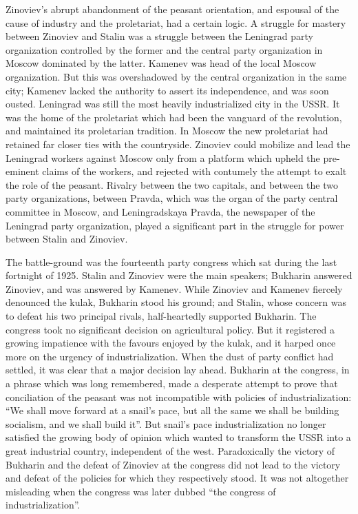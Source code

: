 Zinoviev's abrupt abandonment of the peasant orientation, and espousal of the cause of industry and the proletariat, had a certain logic. A struggle for mastery between Zinoviev and Stalin was a struggle between the Leningrad party organization controlled by the former and the central party organization in Moscow dominated by the latter. Kamenev was head of the local Moscow organization. But this was overshadowed by the central organization in the same city; Kamenev lacked the authority to assert its independence, and was soon ousted. Leningrad was still the most heavily industrialized city in the USSR. It was the home of the proletariat which had been the vanguard of the revolution, and maintained its proletarian tradition. In Moscow the new proletariat had retained far closer ties with the countryside. Zinoviev could mobilize and lead the Leningrad workers against Moscow only from a platform which upheld the pre-eminent claims of the workers, and rejected with contumely the attempt to exalt the role of the peasant. Rivalry between the two capitals, and between the two party organizations, between Pravda, which was the organ of the party central committee in Moscow, and Leningradskaya Pravda, the newspaper of the Leningrad party organization, played a significant part in the struggle for power between Stalin and Zinoviev. 

The battle-ground was the fourteenth party congress which sat during the last fortnight of 1925. Stalin and Zinoviev were the main speakers; Bukharin answered Zinoviev, and was answered by Kamenev. While Zinoviev and Kamenev fiercely denounced the kulak, Bukharin stood his ground; and Stalin, whose concern was to defeat his two principal rivals, half-heartedly supported Bukharin. The congress took no significant decision on agricultural policy. But it registered a growing impatience with the favours enjoyed by the kulak, and it harped once more on the urgency of industrialization. When the dust of party conflict had settled, it was clear that a major decision lay ahead. Bukharin at the congress, in a phrase which was long remembered, made a desperate attempt to prove that conciliation of the peasant was not incompatible with policies of industrialization: ``We shall move forward at a snail's pace, but all the same we shall be building socialism, and we shall build it''. But snail's pace industrialization no longer satisfied the growing body of opinion which wanted to transform the USSR into a great industrial country, independent of the west. Paradoxically the victory of Bukharin and the defeat of Zinoviev at the congress did not lead to the victory and defeat of the policies for which they respectively stood. It was not altogether misleading when the congress was later dubbed ``the congress of industrialization''. 

